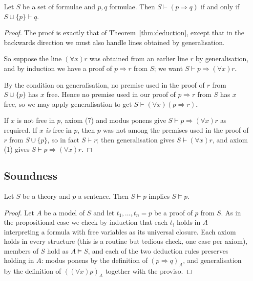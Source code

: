 \documentclass[a4paper]{scrartcl}
\begin{document}
\begin{proposition}\label{prop:preddeduction}
  Let $S$ be a set of formulae and $p, q$ formulae. Then $S \vdash (p \Rightarrow q)$ if and only if $S \cup \{p\} \vdash q$.
\end{proposition}
\begin{proof}
  The proof is exactly that of Theorem~\ref{thm:deduction}, except that in the backwards direction we must also handle lines obtained by generalisation.

  So suppose the line $(\forall x) r$ was obtained from an earlier line $r$ by generalisation, and by induction we have a proof of $p \Rightarrow r$ from $S$; we want $S \vdash p \Rightarrow (\forall x) r$.

  By the condition on generalisation, no premise used in the proof of $r$ from $S \cup \{p\}$ has $x$ free. Hence no premise used in our proof of $p \Rightarrow r$ from $S$ has $x$ free, so we may apply generalisation to get $S \vdash (\forall x)(p \Rightarrow r)$.

  If $x$ is not free in $p$, axiom (7) and modus ponens give $S \vdash p \Rightarrow (\forall x) r$ as required. If $x$ \emph{is} free in $p$, then $p$ was not among the premises used in the proof of $r$ from $S \cup \{p\}$, so in fact $S \vdash r$; then generalisation gives $S \vdash (\forall x) r$, and axiom (1) gives $S \vdash p \Rightarrow (\forall x) r$.
\end{proof}

\subsection{Soundness}

\begin{proposition}[Soundness]
  Let $S$ be a theory and $p$ a sentence. Then $S \vdash p$ implies $S \models p$.
\end{proposition}
\begin{proof}
  Let $A$ be a model of $S$ and let $t_1, \dots, t_n = p$ be a proof of $p$ from $S$. As in the propositional case we check by induction that each $t_i$ holds in $A$ -- interpreting a formula with free variables as its universal closure. Each axiom holds in every structure (this is a routine but tedious check, one case per axiom), members of $S$ hold as $A \models S$, and each of the two deduction rules preserves holding in $A$: modus ponens by the definition of $(p \Rightarrow q)_A$, and generalisation by the definition of $((\forall x)p)_A$ together with the proviso.
\end{proof}
\end{document}
